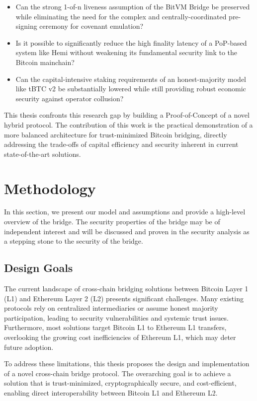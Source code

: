 \documentclass{DESSThesis}
\begin{document}
\begin{itemize}
    \item Can the strong 1-of-n liveness assumption of the BitVM Bridge be preserved while eliminating the need for the complex and centrally-coordinated pre-signing ceremony for covenant emulation?
    \item Is it possible to significantly reduce the high finality latency of a PoP-based system like Hemi without weakening its fundamental security link to the Bitcoin mainchain?
    \item Can the capital-intensive staking requirements of an honest-majority model like tBTC v2 be substantially lowered while still providing robust economic security against operator collusion?
\end{itemize}

This thesis confronts this research gap by building a Proof-of-Concept of a novel hybrid protocol. The contribution of this work is the practical demonstration of a more balanced architecture for trust-minimized Bitcoin bridging, directly addressing the trade-offs of capital efficiency and security inherent in current state-of-the-art solutions.


\chapter{Methodology} \label{chap:methodology}
\thispagestyle{empty}
In this section, we present our model and assumptions and provide a high-level overview of the bridge. The security properties of the bridge may be of independent interest and will be discussed and proven in the security analysis as a stepping stone to the security of the bridge.

\section{Design Goals}
\sloppy
The current landscape of cross-chain bridging solutions between Bitcoin Layer 1 (L1) and Ethereum Layer 2 (L2) presents significant challenges. Many existing protocols rely on centralized intermediaries or assume honest majority participation, leading to security vulnerabilities and systemic trust issues. Furthermore, most solutions target Bitcoin L1 to Ethereum L1 transfers, overlooking the growing cost inefficiencies of Ethereum L1, which may deter future adoption.

To address these limitations, this thesis proposes the design and implementation of a novel cross-chain bridge protocol. The overarching goal is to achieve a solution that is trust-minimized, cryptographically secure, and cost-efficient, enabling direct interoperability between Bitcoin L1 and Ethereum L2.
\end{document}
